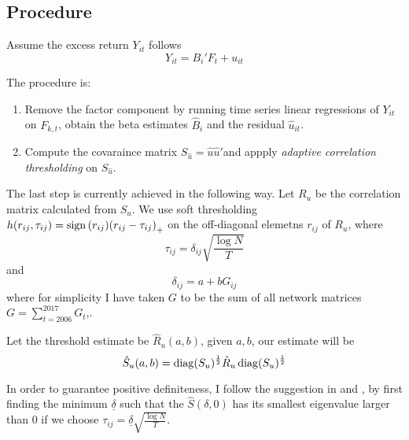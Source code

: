 \subsection{Procedure}
Assume the excess return \(Y_{it}\) follows
\begin{equation*}
    Y_{it} = B_{i}' F_{t} + u_{it}
\end{equation*}

The procedure is:
\begin{enumerate}
    \item Remove the factor component by running time series linear regressions of \(Y_{it}\) on \(F_{k,t}\), obtain the beta estimates \(\hat{B}_{i}\) and the residual \(\hat{u}_{it}\). 
    \item Compute the covaraince matrix \(S_{\hat{u}} = \hat{u}\hat{u}'\)and appply \textit{adaptive correlation thresholding} on \(S_{\hat{u}}\). 
\end{enumerate}

The last step is currently achieved in the following way. Let \(R_{u}\) be the correlation matrix calculated from \(S_{u}\). We use soft thresholding \(h(r_{ij}, \tau_{ij}) = \sign\pqty{r_{ij}} \pqty{r_{ij} - \tau_{ij}}_{+}\) on the off-diagonal elemetns \(r_{ij}\) of \(R_{u}\), where 
\begin{equation*}
    \tau_{ij} = \delta_{ij} \sqrt{\frac{\log N}{T}}
\end{equation*}
and 
\begin{equation*}
    \delta_{ij} = a + b G_{ij}
\end{equation*}
where for simplicity I have taken \(G\) to be the sum of all network matrices \(G = \sum_{t =2006}^{2017} G_{t}\),. 

Let the threshold estimate be \(\hat{R}_{u}(a,b)\), given \(a,b\), our estimate will be
\begin{equation*}
    \hat{S}_{u}(a,b) = \operatorname{diag}(S_{u})^{\frac{1}{2}} \hat{R}_{u}\operatorname{diag}(S_{u})^{\frac{1}{2}}
\end{equation*}

In order to guarantee positive definiteness, I follow the suggestion in \cite{fan2015OverviewEstimation} and \cite{fan2013LargeCovariance}, by first finding the minimum \(\underline{\delta}\) such that the \(\hat{S}(\delta, 0)\) has its smallest eigenvalue larger than \(0\) if we choose \(\tau_{ij} = \underline{\delta} \sqrt{\frac{\log N}{T}}\). 

